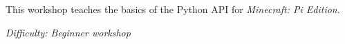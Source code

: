 %
%
%

\newif\ifprint
\printfalse



\newcommand{\workshopTitle}{Workshop 17: \textit{Minecraft: Pi Edition}}

\newcommand{\workshopAuthor}{Jack Kelly}



	
	
	This workshop teaches the basics of the Python API for \textit{Minecraft: Pi Edition}.
	
	\textit{Difficulty: Beginner workshop}

	\ifprint
		\renewcommand{\baselinestretch}{0.75}\normalsize
		\tableofcontents
		\renewcommand{\baselinestretch}{1.0}\normalsize
	\else
		\tableofcontents
	\fi
	
	
	
		\clearpage
		
	
		\webclearpage
		
	
		\webclearpage
	
	
	\webclearpage
		

